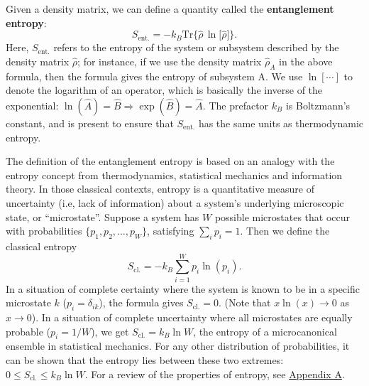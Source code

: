 \documentclass[pra,11pt]{revtex4}
\begin{document}
Given a density matrix, we can define a quantity called the
\textbf{entanglement entropy}:
$$S_{\mathrm{ent.}} = - k_B \mathrm{Tr} \Big\{ \hat{\rho}\, \ln\!\big[\hat{\rho}\big]\Big\}.$$
Here, $S_{\mathrm{ent.}}$ refers to the entropy of the system or
subsystem described by the density matrix $\hat{\rho}$; for instance,
if we use the density matrix $\hat{\rho}_A$ in the above formula, then
the formula gives the entropy of subsystem A.  We use $\ln[\cdots]$ to
denote the logarithm of an operator, which is basically the inverse of
the exponential: $\ln(\hat{A}) = \hat{B} \Rightarrow \exp(\hat{B}) =
\hat{A}$.  The prefactor $k_B$ is Boltzmann's constant, and is present
to ensure that $S_{\mathrm{ent.}}$ has the same units as thermodynamic
entropy.

The definition of the entanglement entropy is based on an analogy with
the entropy concept from thermodynamics, statistical mechanics and
information theory.  In those classical contexts, entropy is a
quantitative measure of uncertainty (i.e, lack of information) about a
system's underlying microscopic state, or ``microstate''.  Suppose a
system has $W$ possible microstates that occur with probabilities
$\{p_1, p_2, \dots, p_W\}$, satisfying $\sum_i p_i = 1$.  Then we
define the classical entropy
$$S_{\mathrm{cl.}} = - k_B \sum_{i=1}^W p_i \ln(p_i).$$
In a situation of complete certainty where the system is known to be
in a specific microstate $k$ ($p_i = \delta_{ik}$), the formula gives
$S_{\mathrm{cl.}} = 0$.  (Note that $x \ln(x)\rightarrow 0$ as
$x\rightarrow 0$).  In a situation of complete uncertainty where all
microstates are equally probable ($p_i = 1/W$), we get
$S_{\mathrm{cl.}} = k_B \ln W$, the entropy of a microcanonical
ensemble in statistical mechanics.  For any other distribution of
probabilities, it can be shown that the entropy lies between these two
extremes: $0 \le S_{\mathrm{cl.}}  \le k_B\ln W$.  For a review of the
properties of entropy, see \hyperref[appendixa]{Appendix A}.
\end{document}
